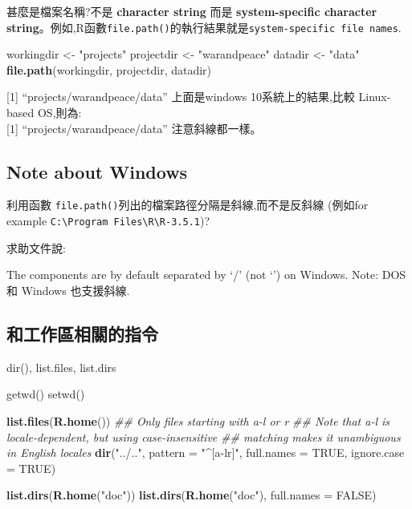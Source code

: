 \documentclass[]{book}
\newenvironment{Shaded}{\begin{snugshade}}{\end{snugshade}}
\newcommand{\CommentTok}[1]{\textcolor[rgb]{0.56,0.35,0.01}{\textit{#1}}}
\newcommand{\DataTypeTok}[1]{\textcolor[rgb]{0.13,0.29,0.53}{#1}}
\newcommand{\KeywordTok}[1]{\textcolor[rgb]{0.13,0.29,0.53}{\textbf{#1}}}
\newcommand{\NormalTok}[1]{#1}
\newcommand{\OtherTok}[1]{\textcolor[rgb]{0.56,0.35,0.01}{#1}}
\newcommand{\StringTok}[1]{\textcolor[rgb]{0.31,0.60,0.02}{#1}}
\theoremstyle{definition}
\theoremstyle{definition}
\theoremstyle{definition}
\theoremstyle{remark}
\begin{document}
甚麼是檔案名稱?不是 \textbf{character string} 而是
\textbf{system-specific character
string}。例如,R函數\texttt{file.path()}的執行結果就是\texttt{system-specific\ file\ names}.

\begin{Shaded}
\begin{Highlighting}[]
\NormalTok{workingdir <-}\StringTok{ "projects"}
\NormalTok{projectdir <-}\StringTok{ "warandpeace"}
\NormalTok{datadir    <-}\StringTok{ "data"}
\KeywordTok{file.path}\NormalTok{(workingdir, projectdir, datadir)}
\end{Highlighting}
\end{Shaded}

{[}1{]} ``projects/warandpeace/data'' 上面是windows 10系統上的結果,比較
Linux-based OS,則為:\\
{[}1{]} ``projects/warandpeace/data'' 注意斜線都一樣。

\hypertarget{note-about-windows}{%
\subsection{Note about Windows}\label{note-about-windows}}

利用函數 \texttt{file.path()}列出的檔案路徑分隔是斜線,而不是反斜線
(例如for example
\texttt{C:\textbackslash{}Program\ Files\textbackslash{}R\textbackslash{}R-3.5.1})?

求助文件說:

The components are by default separated by `/' (not `') on Windows.
Note: DOS 和 Windows 也支援斜線.

\subsection{和工作區相關的指令}

dir(), list.files, list.dirs

getwd() setwd()

\begin{Shaded}
\begin{Highlighting}[]
\KeywordTok{list.files}\NormalTok{(}\KeywordTok{R.home}\NormalTok{())}
\CommentTok{## Only files starting with a-l or r}
\CommentTok{## Note that a-l is locale-dependent, but using case-insensitive}
\CommentTok{## matching makes it unambiguous in English locales}
\KeywordTok{dir}\NormalTok{(}\StringTok{"../.."}\NormalTok{, }\DataTypeTok{pattern =} \StringTok{"^[a-lr]"}\NormalTok{, }\DataTypeTok{full.names =} \OtherTok{TRUE}\NormalTok{, }\DataTypeTok{ignore.case =} \OtherTok{TRUE}\NormalTok{)}

\KeywordTok{list.dirs}\NormalTok{(}\KeywordTok{R.home}\NormalTok{(}\StringTok{"doc"}\NormalTok{))}
\KeywordTok{list.dirs}\NormalTok{(}\KeywordTok{R.home}\NormalTok{(}\StringTok{"doc"}\NormalTok{), }\DataTypeTok{full.names =} \OtherTok{FALSE}\NormalTok{)}
\end{Highlighting}
\end{Shaded}
\end{document}

